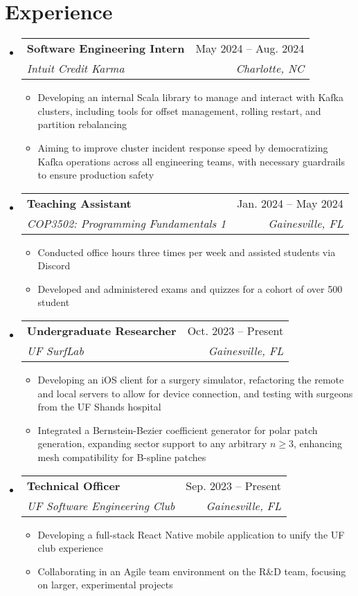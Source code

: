 \documentclass[letterpaper,12pt]{article}
\makeatletter
\newcommand{\resumeItem}[1]{
  \item\small{
    {#1 \vspace{-2pt}}
  }
}
\newcommand{\resumeSubheading}[4]{
  \vspace{-2pt}\item
    \begin{tabular*}{0.97\textwidth}[t]{l@{\extracolsep{\fill}}r}
      \textbf{#1} & #2 \\
      \textit{\small#3} & \textit{\small #4} \\
    \end{tabular*}\vspace{-7pt}
}
\newcommand{\resumeSubHeadingListStart}{\begin{itemize}[leftmargin=0.15in, label={}]}
\newcommand{\resumeSubHeadingListEnd}{\end{itemize}}
\newcommand{\resumeItemListStart}{\begin{itemize}}
\newcommand{\resumeItemListEnd}{\end{itemize}\vspace{-5pt}}
\makeatother
\begin{document}
\section{Experience}
  \resumeSubHeadingListStart
    \resumeSubheading
      {Software Engineering Intern}{May 2024 -- Aug. 2024}
      {Intuit Credit Karma}{Charlotte, NC}
      \resumeItemListStart
        \resumeItem{Developing an internal Scala library to manage and interact with Kafka clusters, including tools for offset management, rolling restart, and partition rebalancing}
        \resumeItem{Aiming to improve cluster incident response speed by democratizing Kafka operations across all engineering teams, with necessary guardrails to ensure production safety}
      \resumeItemListEnd
    \resumeSubheading
      {Teaching Assistant}{Jan. 2024 -- May 2024}
      {COP3502: Programming Fundamentals 1}{Gainesville, FL}
      \resumeItemListStart
        \resumeItem{Conducted office hours three times per week and assisted students via Discord}
        \resumeItem{Developed and administered exams and quizzes for a cohort of over 500 student}
      \resumeItemListEnd
    \resumeSubheading
      {Undergraduate Researcher}{Oct. 2023 -- Present}
      {UF SurfLab}{Gainesville, FL}
      \resumeItemListStart
        \resumeItem{Developing an iOS client for a surgery simulator, refactoring the remote and local servers to allow for device connection, and testing with surgeons from the UF Shands hospital}
        \resumeItem{Integrated a Bernstein-Bezier coefficient generator for polar patch generation, expanding sector support to any arbitrary $n \geq 3$, enhancing mesh compatibility for B-spline patches}
    \resumeItemListEnd
    \resumeSubheading
      {Technical Officer}{Sep. 2023 -- Present}
      {UF Software Engineering Club}{Gainesville, FL}
      \resumeItemListStart
        \resumeItem{Developing a full-stack React Native mobile application to unify the UF club experience}
        \resumeItem{Collaborating in an Agile team environment on the R\&D team, focusing on larger, experimental projects}
      \resumeItemListEnd
    \resumeSubHeadingListEnd
\end{document}
